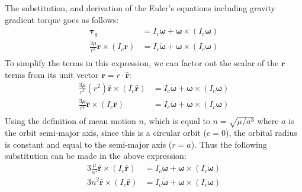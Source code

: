 \documentclass[titlepage]{article}
\begin{document}
The substitution, and derivation of the Euler's equations including gravity gradient torque goes as follows:
\begin{equation}
	\begin{split}
		\boldsymbol{\tau}_g&=I_c\dot{\boldsymbol{\omega}}+\boldsymbol{\omega}\times\left(I_c\boldsymbol{\omega}\right) \\
		\frac{3\mu}{r^5}\boldsymbol{r}\times\left(I_c\boldsymbol{r}\right)&=I_c\dot{\boldsymbol{\omega}}+\boldsymbol{\omega}\times\left(I_c\boldsymbol{\omega}\right) \\
	\end{split}
\end{equation} 
To simplify the terms in this expression, we can factor out the scalar of the $\boldsymbol{r}$ terms from its unit vector $\boldsymbol{r}=r\cdot\hat{\boldsymbol{r}}$:
\begin{equation}
	\begin{split}
		\frac{3\mu}{r^5}\left(r^2\right)\hat{\boldsymbol{r}}\times\left(I_c\hat{\boldsymbol{r}}\right)&=I_c\dot{\boldsymbol{\omega}}+\boldsymbol{\omega}\times\left(I_c\boldsymbol{\omega}\right) \\
		\frac{3\mu}{r^3}\hat{\boldsymbol{r}}\times\left(I_c\hat{\boldsymbol{r}}\right)&=I_c\dot{\boldsymbol{\omega}}+\boldsymbol{\omega}\times\left(I_c\boldsymbol{\omega}\right) \\
	\end{split}
\end{equation}
Using the definition of mean motion $n$, which is equal to $n=\sqrt{\mu/a^3}$ where $a$ is the orbit semi-major axis, since this is a circular orbit ($e=0$), the orbital radius is constant and equal to the semi-major axis ($r=a$). Thus the following substitution can be made in the above expression: 
\begin{equation}
	\begin{split}
		3\frac{\mu}{a^3}\hat{\boldsymbol{r}}\times\left(I_c\hat{\boldsymbol{r}}\right)&=I_c\dot{\boldsymbol{\omega}}+\boldsymbol{\omega}\times\left(I_c\boldsymbol{\omega}\right) \\
		3n^2\hat{\boldsymbol{r}}\times\left(I_c\hat{\boldsymbol{r}}\right)&=I_c\dot{\boldsymbol{\omega}}+\boldsymbol{\omega}\times\left(I_c\boldsymbol{\omega}\right) \\
	\end{split}
\end{equation}
\end{document}
